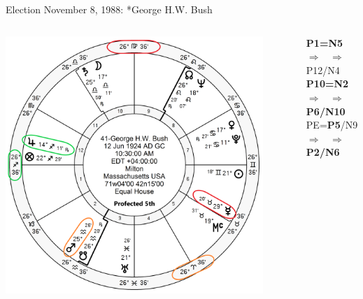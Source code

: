 \begin{frame}[t]{Election November 8, 1988: *George H.W. Bush}
\begin{columns}[T, onlytextwidth]
\vspace{-1em}
{\includegraphics[width=0.9\textwidth]{charts/GHW-Bush-Prof-5th.png}}
\fontsize{8pt}{9pt}\selectfont

\textbf{\dgreen P1=N5} 
	$\Rightarrow$ \Jupiter\, $\Rightarrow$ P12/N4\\
\textbf{\red P10=N2}
	$\Rightarrow$ \Mercury\, $\Rightarrow$ \textbf{\red P6/N10}\\
PE=\textbf{\dgreen P5}/N9
	 $\Rightarrow$ \Mars\, $\Rightarrow$ \textbf{\red P2/N6}

\end{columns}
\end{frame}

